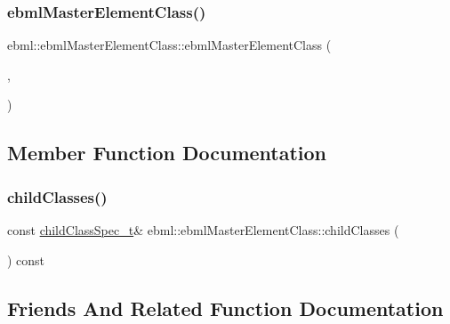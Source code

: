 \subsubsection{\texorpdfstring{ebml\+Master\+Element\+Class()}{ebmlMasterElementClass()}\hspace{0.1cm}{\footnotesize\ttfamily [2/2]}}
{\footnotesize\ttfamily ebml\+::ebml\+Master\+Element\+Class\+::ebml\+Master\+Element\+Class (\begin{DoxyParamCaption}\item[{\mbox{\hyperlink{namespaceebml_a86c5f604ddf12a74aa9812e997a58691}{ebml\+I\+D\+\_\+t}}}]{,  }\item[{const std\+::wstring \&}]{ }\end{DoxyParamCaption})}



\subsection{Member Function Documentation}
\mbox{\label{classebml_1_1ebmlMasterElementClass_ab3d49576f8ac2963fa5b996d692175ab}} 
\subsubsection{\texorpdfstring{child\+Classes()}{childClasses()}}
{\footnotesize\ttfamily const \mbox{\hyperlink{classebml_1_1childClassSpec__t}{child\+Class\+Spec\+\_\+t}}\& ebml\+::ebml\+Master\+Element\+Class\+::child\+Classes (\begin{DoxyParamCaption}{ }\end{DoxyParamCaption}) const}



\subsection{Friends And Related Function Documentation}
\mbox{\label{classebml_1_1ebmlMasterElementClass_ad88e86cba72e9332a4693c1c6009b281}} 
